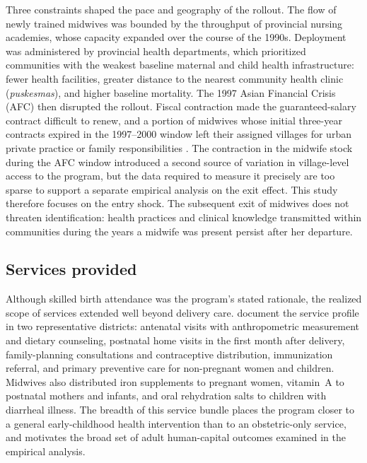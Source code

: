 Three constraints shaped the pace and geography of the rollout. The flow of newly trained midwives was bounded by the throughput of provincial nursing academies, whose capacity expanded over the course of the 1990s. Deployment was administered by provincial health departments, which prioritized communities with the weakest baseline maternal and child health infrastructure: fewer health facilities, greater distance to the nearest community health clinic (\emph{puskesmas}), and higher baseline mortality. The 1997 Asian Financial Crisis (AFC) then disrupted the rollout. Fiscal contraction made the guaranteed-salary contract difficult to renew, and a portion of midwives whose initial three-year contracts expired in the 1997--2000 window left their assigned villages for urban private practice or family responsibilities \autocite{triyana2016,jointcommittee2013}. The contraction in the midwife stock during the AFC window introduced a second source of variation in village-level access to the program, but the data required to measure it precisely are too sparse to support a separate empirical analysis on the exit effect. This study therefore focuses on the entry shock. The subsequent exit of midwives does not threaten identification: health practices and clinical knowledge transmitted within communities during the years a midwife was present persist after her departure.

\subsection{Services provided}

Although skilled birth attendance was the program's stated rationale, the realized scope of services extended well beyond delivery care. \textcite{makowiecka2008} document the service profile in two representative districts: antenatal visits with anthropometric measurement and dietary counseling, postnatal home visits in the first month after delivery, family-planning consultations and contraceptive distribution, immunization referral, and primary preventive care for non-pregnant women and children. Midwives also distributed iron supplements to pregnant women, vitamin~A to postnatal mothers and infants, and oral rehydration salts to children with diarrheal illness. The breadth of this service bundle places the program closer to a general early-childhood health intervention than to an obstetric-only service, and motivates the broad set of adult human-capital outcomes examined in the empirical analysis.

